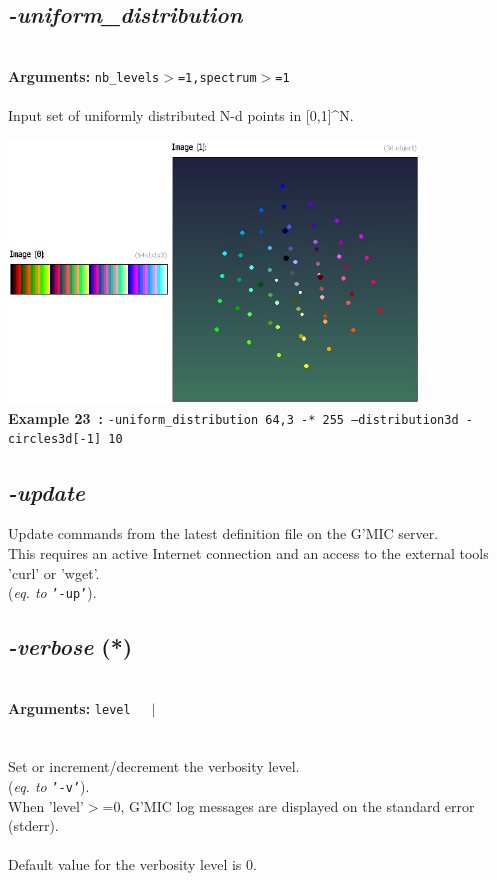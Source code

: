 \documentclass[a4paper,11pt,twoside]{book}
\begin{document}
\subsection{\emph{-uniform\_distribution} }\vspace*{-0.5em}
~\\\textbf{Arguments: } 
{\small \texttt{nb\_levels$>$=1,spectrum$>$=1}}\\~\\
Input set of uniformly distributed N-d points in [0,1]\textasciicircum N.
\begin{center}\includegraphics[keepaspectratio=true,height=7cm,width=\textwidth]{img/gmic_def23.jpg}\\
{\footnotesize \textbf{Example 23~:} \texttt{-uniform\_distribution 64,3 -* 255 --distribution3d -circles3d[-1] 10}}
\end{center}

\subsection{\emph{-update} }\vspace*{-0.5em}
Update commands from the latest definition file on the G'MIC server.
~\\This requires an active Internet connection and an access to the external
tools 'curl' or 'wget'.
~\\(\emph{eq. to} {\small \texttt{'-up'}}).


\subsection{\emph{-verbose} (*)}\vspace*{-0.5em}
~\\\textbf{Arguments: } 
{\small \texttt{level}}~~~$|$\\
\hspace*{2.2cm}{\small \texttt{\{ + ~$|$~ - \}}}\\~\\
Set or increment/decrement the verbosity level.
~\\(\emph{eq. to} {\small \texttt{'-v'}}).
~\\When 'level'$>$=0, G'MIC log messages are displayed on the standard error (stderr).
~\\~\\Default value for the verbosity level is 0.
\end{document}
